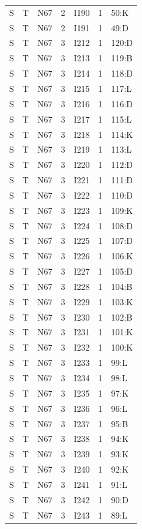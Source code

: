 {\begin{longtable}{lllrlrp{.35\linewidth}}
S & T & N67 & 2 & I190 & 1 & 50:K \\
S & T & N67 & 2 & I191 & 1 & 49:D \\
S & T & N67 & 3 & I212 & 1 & 120:D \\
S & T & N67 & 3 & I213 & 1 & 119:B \\
S & T & N67 & 3 & I214 & 1 & 118:D \\
S & T & N67 & 3 & I215 & 1 & 117:L \\
S & T & N67 & 3 & I216 & 1 & 116:D \\
S & T & N67 & 3 & I217 & 1 & 115:L \\
S & T & N67 & 3 & I218 & 1 & 114:K \\
S & T & N67 & 3 & I219 & 1 & 113:L \\
S & T & N67 & 3 & I220 & 1 & 112:D \\
S & T & N67 & 3 & I221 & 1 & 111:D \\
S & T & N67 & 3 & I222 & 1 & 110:D \\
S & T & N67 & 3 & I223 & 1 & 109:K \\
S & T & N67 & 3 & I224 & 1 & 108:D \\
S & T & N67 & 3 & I225 & 1 & 107:D \\
S & T & N67 & 3 & I226 & 1 & 106:K \\
S & T & N67 & 3 & I227 & 1 & 105:D \\
S & T & N67 & 3 & I228 & 1 & 104:B \\
S & T & N67 & 3 & I229 & 1 & 103:K \\
S & T & N67 & 3 & I230 & 1 & 102:B \\
S & T & N67 & 3 & I231 & 1 & 101:K \\
S & T & N67 & 3 & I232 & 1 & 100:K \\
S & T & N67 & 3 & I233 & 1 & 99:L \\
S & T & N67 & 3 & I234 & 1 & 98:L \\
S & T & N67 & 3 & I235 & 1 & 97:K \\
S & T & N67 & 3 & I236 & 1 & 96:L \\
S & T & N67 & 3 & I237 & 1 & 95:B \\
S & T & N67 & 3 & I238 & 1 & 94:K \\
S & T & N67 & 3 & I239 & 1 & 93:K \\
S & T & N67 & 3 & I240 & 1 & 92:K \\
S & T & N67 & 3 & I241 & 1 & 91:L \\
S & T & N67 & 3 & I242 & 1 & 90:D \\
S & T & N67 & 3 & I243 & 1 & 89:L \\

\end{longtable}}
